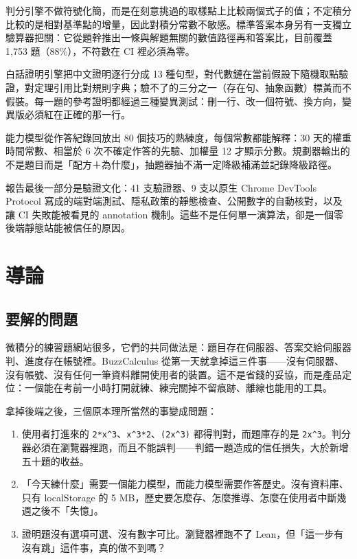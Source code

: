 \documentclass[11pt,a4paper,oneside]{report}
\renewcommand{\_}{\ifmmode\origunderscore\else\textunderscore\allowbreak\fi}
\newcommand{\code}[1]{\texttt{#1}}
\begin{document}
判分引擎不做符號化簡，而是在刻意挑過的取樣點上比較兩個式子的值；不定積分比較的是相對基準點的增量，因此對積分常數不敏感。標準答案本身另有一支獨立驗算器把關：它從題幹推出一條與解題無關的數值路徑再和答案比，目前覆蓋 1,753 題（88\%），不符數在 CI 裡必須為零。

白話證明引擎把中文證明逐行分成 13 種句型，對代數鏈在當前假設下隨機取點驗證，對定理引用比對規則字典；驗不了的三分之一（存在句、抽象函數）標黃而不假裝。每一題的參考證明都經過三種變異測試：刪一行、改一個符號、換方向，變異版必須紅在正確的那一行。

能力模型從作答紀錄回放出 80 個技巧的熟練度，每個常數都能解釋：30 天的權重時間常數、相當於 6 次不確定作答的先驗、加權量 12 才顯示分數。規劃器輸出的不是題目而是「配方＋為什麼」，抽題器抽不滿一定降級補滿並記錄降級路徑。

報告最後一部分是驗證文化：41 支驗證器、9 支以原生 Chrome DevTools Protocol 寫成的端對端測試、隱私政策的靜態檢查、公開數字的自動核對，以及讓 CI 失敗能被看見的 annotation 機制。這些不是任何單一演算法，卻是一個零後端靜態站能被信任的原因。

\tableofcontents

\chapter{導論}
\section{要解的問題}
微積分的練習題網站很多，它們的共同做法是：題目存在伺服器、答案交給伺服器判、進度存在帳號裡。BuzzCalculus 從第一天就拿掉這三件事——沒有伺服器、沒有帳號、沒有任何一筆資料離開使用者的裝置。這不是省錢的妥協，而是產品定位：一個能在考前一小時打開就練、練完關掉不留痕跡、離線也能用的工具。

拿掉後端之後，三個原本理所當然的事變成問題：
\begin{enumerate}[label=\arabic*.]
  \item 使用者打進來的 \code{2*x\string^3}、\code{x\string^3*2}、\code{(2x\string^3)} 都得判對，而題庫存的是 \code{2x\string^3}。判分器必須在瀏覽器裡跑，而且不能誤判——判錯一題造成的信任損失，大於新增五十題的收益。
  \item 「今天練什麼」需要一個能力模型，而能力模型需要作答歷史。沒有資料庫、只有 localStorage 的 5 MB，歷史要怎麼存、怎麼推導、怎麼在使用者中斷幾週之後不「失憶」。
  \item 證明題沒有選項可選、沒有數字可比。瀏覽器裡跑不了 Lean，但「這一步有沒有跳」這件事，真的做不到嗎？
\end{enumerate}
\end{document}
